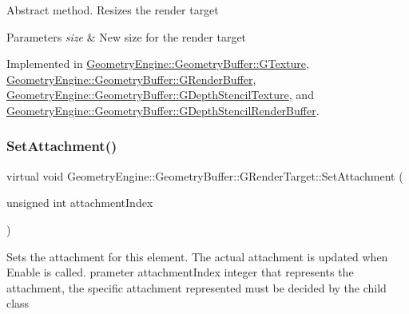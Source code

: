 Abstract method. Resizes the render target 
\begin{DoxyParams}{Parameters}
{\em size} & New size for the render target \\
\hline
\end{DoxyParams}


Implemented in \mbox{\hyperlink{class_geometry_engine_1_1_geometry_buffer_1_1_g_texture_a17c5c626b214d8d0bfb9988b52376a55}{Geometry\+Engine\+::\+Geometry\+Buffer\+::\+G\+Texture}}, \mbox{\hyperlink{class_geometry_engine_1_1_geometry_buffer_1_1_g_render_buffer_a3a3e0b2e031cce1c0bea9c2a4bc5465a}{Geometry\+Engine\+::\+Geometry\+Buffer\+::\+G\+Render\+Buffer}}, \mbox{\hyperlink{class_geometry_engine_1_1_geometry_buffer_1_1_g_depth_stencil_texture_a692ca73521e51be802c981ab05029369}{Geometry\+Engine\+::\+Geometry\+Buffer\+::\+G\+Depth\+Stencil\+Texture}}, and \mbox{\hyperlink{class_geometry_engine_1_1_geometry_buffer_1_1_g_depth_stencil_render_buffer_aee7b6a5ecc14a2aac4c6f363fa609720}{Geometry\+Engine\+::\+Geometry\+Buffer\+::\+G\+Depth\+Stencil\+Render\+Buffer}}.

\mbox{\label{class_geometry_engine_1_1_geometry_buffer_1_1_g_render_target_a1031c44ad374654e2183d3b1b99638a3}} 
\subsubsection{\texorpdfstring{SetAttachment()}{SetAttachment()}}
{\footnotesize\ttfamily virtual void Geometry\+Engine\+::\+Geometry\+Buffer\+::\+G\+Render\+Target\+::\+Set\+Attachment (\begin{DoxyParamCaption}\item[{unsigned int}]{attachment\+Index }\end{DoxyParamCaption})\hspace{0.3cm}{\ttfamily [pure virtual]}}

Sets the attachment for this element. The actual attachment is updated when Enable is called. prameter attachment\+Index integer that represents the attachment, the specific attachment represented must be decided by the child class 


